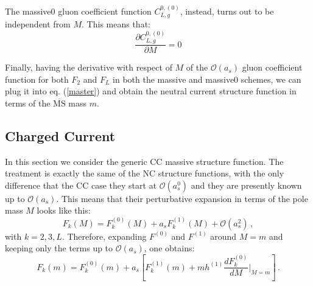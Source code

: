 \documentclass[10pt,a4paper]{article}
\begin{document}
The massive0 gluon coefficient function $C_{L,g}^{0,(0)}$, instead, turns out to be independent from $M$. This means that:
\begin{equation}
\frac{\partial C_{L,g}^{0,(0)}}{\partial M}= 0
\end{equation}

Finally, having the derivative with respect of $M$ of the $\mathcal{O}(a_s)$ gluon coefficient function for both $F_2$ and $F_L$ in both the massive and massive0 schemes, we can plug it into eq. (\ref{master}) and obtain the neutral current structure function in terms of the $\overline{\mbox{MS}}$ mass $m$.

\subsection{Charged Current}

In this section we consider the generic CC massive structure function. The treatment is exactly the same of the NC structure functions, with the only difference that the CC case they start at $\mathcal{O}(a_s^0)$ and they are presently known up to $\mathcal{O}(a_s)$. This means that their perturbative expansion in terms of the pole mass $M$ looks like this:
\begin{equation}
F_k(M) = F_k^{(0)}(M) + a_sF_k^{(1)}(M) + \mathcal{O}(a_s^2)\,,
\end{equation}
with $k=2,3,L$. Therefore, expanding $F^{(0)}$ and $F^{(1)}$ around $M=m$ and keeping only the terms up to $\mathcal{O}(a_s)$, one obtains:
\begin{equation}\label{gigi}
F_k(m) = F_k^{(0)}(m) + a_s\left[F_k^{(1)}(m)+mh^{(1)}\frac{dF_k^{(0)}}{dM}\bigg|_{M=m}\right]\,.
\end{equation}
\end{document}
